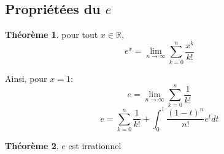 \documentclass[fleqn]{article}
\theoremstyle{definition} \newtheorem*{defi}{D\'efinition}
\theoremstyle{definition} \newtheorem*{theo}{Th\'eor\`eme}
\theoremstyle{definition} \newtheorem*{prop}{Propri\'et\'e}
\begin{document}
\subsection{Propri\'et\'ees du $e$}
\begin{theo} pour tout $x \in \mathbb{R}$, \\
		\[e^x = \lim_{n\to\infty} \sum_{k=0}^{n} \frac{x^k}{k!} \]
\end{theo}
Ainsi, pour $x = 1$:
		\[e = \lim_{n\to\infty} \sum_{k=0}^{n} \frac{1}{k!}\]
		\[e = \sum_{k=0}^{n} \frac{1}{k!} + \int_{0}^{1} \frac{(1-t)^n}{n!}e^tdt\]
\begin{theo} $e$ est irrationnel \end{theo}
\end{document}
